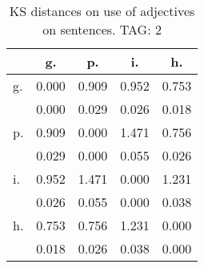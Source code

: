 \begin{table}[h!]
\begin{center}
\begin{tabular}{| l | c | c | c | c |}\hline
 & g. & p. & i. & h. \\\hline
g. & 0.000  & 0.909  & 0.952  & 0.753 \\\hline
 & 0.000  & 0.029  & 0.026  & 0.018 \\\hline
p. & 0.909  & 0.000  & 1.471  & 0.756 \\\hline
 & 0.029  & 0.000  & 0.055  & 0.026 \\\hline
i. & 0.952  & 1.471  & 0.000  & 1.231 \\\hline
 & 0.026  & 0.055  & 0.000  & 0.038 \\\hline
h. & 0.753  & 0.756  & 1.231  & 0.000 \\\hline
 & 0.018  & 0.026  & 0.038  & 0.000 \\\hline
\end{tabular}
\caption{KS distances on use of adjectives on sentences. TAG: 2}
\end{center}
\end{table}